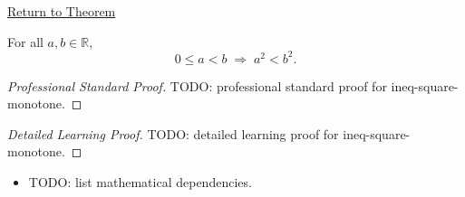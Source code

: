 \newpage
{}
\label{prf:ineq-square-monotone}

\begin{remark*}[Return]
\hyperref[thm:ineq-square-monotone]{Return to Theorem}
\end{remark*}

\begin{theorem*}
For all $a, b \in \mathbb{R}$,
\[
  0 \le a < b \;\Rightarrow\; a^2 < b^2.
\]
\end{theorem*}

\begin{proof}[Professional Standard Proof]
\LRAProofBodyStart
TODO: professional standard proof for ineq-square-monotone.
\end{proof}

\begin{proof}[Detailed Learning Proof]
\LRAProofBodyStart
TODO: detailed learning proof for ineq-square-monotone.
\end{proof}

\begin{remark*}
\end{remark*}

\begin{dependencies}
\begin{itemize}
  \item TODO: list mathematical dependencies.
\end{itemize}
\end{dependencies}

\clearpage
